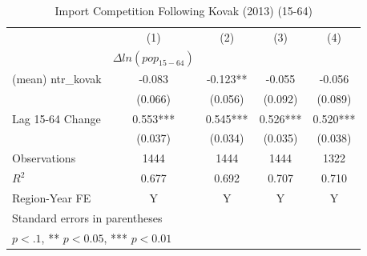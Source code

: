 \documentclass[12pt, final]{CSP}
\begin{document}
\begin{table}[htbp]\centering
\def\sym#1{\ifmmode^{#1}\else\(^{#1}\)\fi}
\caption{Import Competition Following Kovak (2013) (15-64)}
\begin{tabular}{l*{4}{c}}
\hline
\hline 
\toprule
                    &\multicolumn{1}{c}{(1)}&\multicolumn{1}{c}{(2)}&\multicolumn{1}{c}{(3)}&\multicolumn{1}{c}{(4)}\\
                    &\multicolumn{1}{c}{$\Delta ln(pop_{15-64})$}&\multicolumn{1}{c}{}&\multicolumn{1}{c}{}&\multicolumn{1}{c}{}\\
\hline
\midrule
(mean) ntr\_kovak    &   -0.083   &   -0.123** &   -0.055   &   -0.056   \\
                    &  (0.066)   &  (0.056)   &  (0.092)   &  (0.089)   \\
\addlinespace
Lag 15-64 Change    &    0.553***&    0.545***&    0.526***&    0.520***\\
                    &  (0.037)   &  (0.034)   &  (0.035)   &  (0.038)   \\
\midrule
\hline 
Observations        &     1444   &     1444   &     1444   &     1322   \\
\(R^{2}\)           &    0.677   &    0.692   &    0.707   &    0.710   \\
Region-Year FE      &        Y   &        Y   &        Y   &        Y   \\
\bottomrule
\hline
\multicolumn{5}{l}{\footnotesize Standard errors in parentheses}\\
\multicolumn{5}{l}{\footnotesize *$p<.1$, ** $p<0.05$, *** $p<0.01$}\\
\end{tabular}
\end{table}
\end{document}
